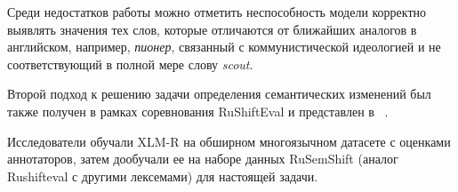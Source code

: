 \documentclass[LI,VKR]{HSEUniversity}
\begin{document}

%

Среди недостатков работы можно отметить неспособность модели корректно выявлять
значения тех слов, которые отличаются от ближайших аналогов в английском, например,
\textit{пионер}, связанный с коммунистической идеологией и не соответствующий в полной мере
слову \textit{scout}.

Второй подход к решению задачи определения семантических изменений был также получен
в рамках соревнования RuShiftEval и представлен в ~\cite{DeepMistake}.

Исследователи обучали XLM-R на обширном многоязычном датасете с оценками аннотаторов,
затем дообучали ее на наборе данных RuSemShift (аналог Rushifteval с другими лексемами)
для настоящей задачи.
\end{document}
